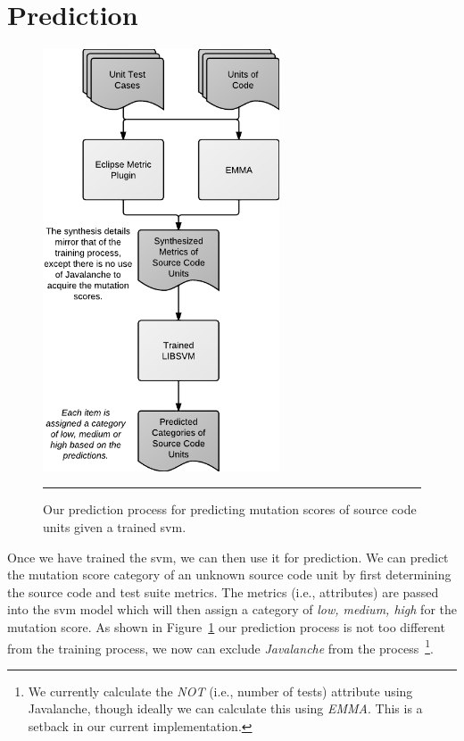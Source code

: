 \section{Prediction}
\label{sec:approach_prediction}
\begin{figure}[!tb]
  \centering
  \includegraphics[width=7cm]{figures/process_prediction.pdf}
  \caption{Our prediction process for predicting mutation scores of source code units given a trained \gls{svm}.}
  \label{fig:process_prediction}
  \vspace{2mm}
  \hrule
\end{figure}

Once we have trained the \gls{svm}, we can then use it for prediction. We can predict the mutation score category of an unknown source code unit by first determining the source code and test suite metrics. The metrics (i.e., attributes) are passed into the \gls{svm} model which will then assign a category of \textit{low, medium, high} for the mutation score. As shown in Figure~\ref{fig:process_prediction} our prediction process is not too different from the training process, we now can exclude \emph{Javalanche} from the process~\footnote{We currently calculate the \emph{NOT} (i.e., number of tests) attribute using Javalanche, though ideally we can calculate this using \emph{EMMA}. This is a setback in our current implementation.}.


